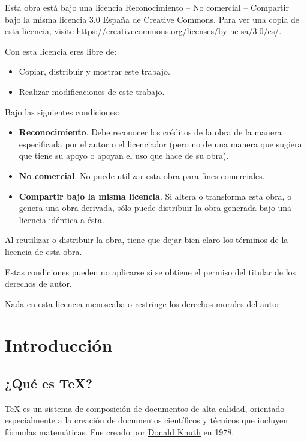\documentclass[
  spanish,
  a4paper,
]{scrreport}
\providecommand{\tightlist}{%
  \setlength{\itemsep}{0pt}\setlength{\parskip}{0pt}}
\theoremstyle{definition}
\theoremstyle{remark}
\begin{document}

Esta obra está bajo una licencia Reconocimiento -- No comercial --
Compartir bajo la misma licencia 3.0 España de Creative Commons. Para
ver una copia de esta licencia, visite
\url{https://creativecommons.org/licenses/by-nc-sa/3.0/es/}.

Con esta licencia eres libre de:

\begin{itemize}
\tightlist
\item
  Copiar, distribuir y mostrar este trabajo.
\item
  Realizar modificaciones de este trabajo.
\end{itemize}

Bajo las siguientes condiciones:

\begin{itemize}
\item
  \textbf{Reconocimiento}. Debe reconocer los créditos de la obra de la
  manera especificada por el autor o el licenciador (pero no de una
  manera que sugiera que tiene su apoyo o apoyan el uso que hace de su
  obra).
\item
  \textbf{No comercial}. No puede utilizar esta obra para fines
  comerciales.
\item
  \textbf{Compartir bajo la misma licencia}. Si altera o transforma esta
  obra, o genera una obra derivada, sólo puede distribuir la obra
  generada bajo una licencia idéntica a ésta.
\end{itemize}

Al reutilizar o distribuir la obra, tiene que dejar bien claro los
términos de la licencia de esta obra.

Estas condiciones pueden no aplicarse si se obtiene el permiso del
titular de los derechos de autor.

Nada en esta licencia menoscaba o restringe los derechos morales del
autor.


\chapter{Introducción}\label{introducciuxf3n}

\section{¿Qué es TeX?}\label{quuxe9-es-tex}

TeX es un sistema de composición de documentos de alta calidad,
orientado especialmente a la creación de documentos científicos y
técnicos que incluyen fórmulas matemáticas. Fue creado por
\href{https://es.wikipedia.org/wiki/Donald_Knuth}{Donald Knuth} en 1978.
\end{document}
